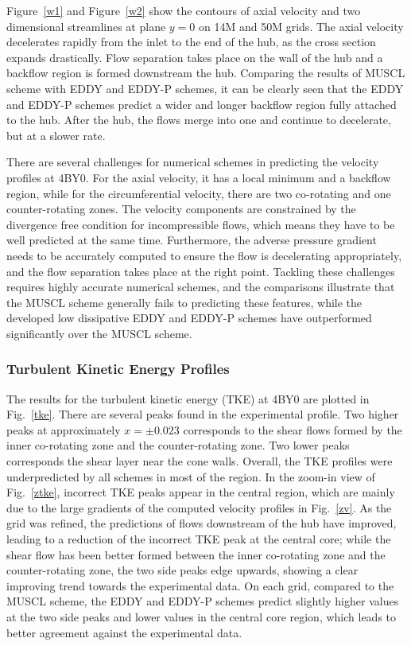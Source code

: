 Figure~\ref{w1} and Figure~\ref{w2} show the contours of axial velocity and two dimensional streamlines at plane $y=0$ on 14M and 50M grids. The axial velocity decelerates rapidly from the inlet to the end of the hub, as the cross section expands drastically. Flow separation takes place on the wall of the hub and a backflow region is formed downstream the hub. Comparing the results of MUSCL scheme with EDDY and EDDY-P schemes, it can be clearly seen that the EDDY and EDDY-P schemes predict a wider and longer backflow region fully attached to the hub. After the hub, the flows merge into one and continue to decelerate, but at a slower rate.

There are several challenges for numerical schemes in predicting the velocity profiles at 4BY0. For the axial velocity, it has a local minimum and a backflow region, while for the circumferential velocity, there are two co-rotating and one counter-rotating zones. The velocity components are constrained by the divergence free condition for incompressible flows, which means they have to be well predicted at the same time. Furthermore, the adverse pressure gradient needs to be accurately computed to ensure the flow is decelerating appropriately, and the flow separation takes place at the right point. Tackling these challenges requires highly accurate numerical schemes, and the comparisons illustrate that the MUSCL scheme generally fails to predicting these features, while the developed low dissipative EDDY and EDDY-P schemes have outperformed significantly over the MUSCL scheme.
\subsubsection{Turbulent Kinetic Energy Profiles}
The results for the turbulent kinetic energy (TKE)  at 4BY0 are plotted in Fig.~\ref{tke}. There are several peaks found in the experimental profile. Two higher peaks at approximately $x=\pm 0.023$ corresponds to the shear flows formed by the inner co-rotating zone and the counter-rotating zone. Two lower peaks corresponds the shear layer near the cone walls. Overall, the TKE profiles were underpredicted by all schemes in most of the region. In the zoom-in view of Fig.~\ref{ztke}, incorrect TKE peaks appear in the central region, which are mainly due to the large gradients of the computed velocity profiles in Fig.~\ref{zv}. As the grid was refined, the predictions of flows downstream of the hub have improved, leading to a reduction of the incorrect TKE peak at the central core; while the shear flow has been better formed between the inner co-rotating zone and the counter-rotating zone, the two side peaks edge upwards, showing a clear improving trend towards the experimental data. On each grid, compared to the MUSCL scheme, the EDDY and EDDY-P schemes predict slightly higher values at the two side peaks and lower values in the central core region, which leads to better agreement against the experimental data. 
